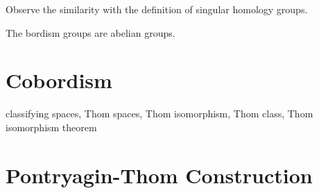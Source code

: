 \documentclass[a4paper,11pt]{article}
\begin{document}
\begin{definition}
\end{definition}

Observe the similarity with the definition of singular homology groups.

\begin{theorem}
    The bordism groups are abelian groups.
\end{theorem}

\begin{definition}
\end{definition}


\section{Cobordism}

classifying spaces, Thom spaces, Thom isomorphism, Thom class, Thom isomorphism theorem

\section{Pontryagin-Thom Construction}
\end{document}
